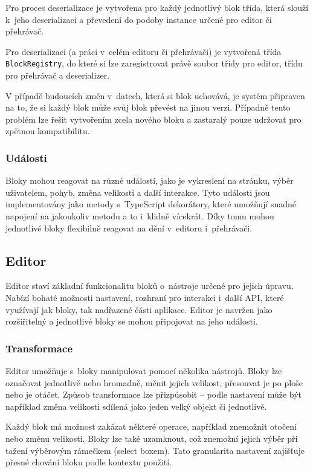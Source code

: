 Pro proces deserializace je vytvořena pro každý jednotlivý blok třída, která slouží k~jeho deserializaci a převedení do podoby instance určené pro editor či přehrávač.

Pro deserializaci (a práci v~celém editoru či přehrávači) je vytvořená třída \texttt{BlockRegistry}, do které si lze zaregistrovat právě soubor třídy pro editor, třídu pro přehrávač a deserializer. 

V případě budoucích změn v~datech, která si blok uchovává, je systém připraven na to, že si každý blok může svůj blok převést na jinou verzi.
Případně tento problém lze řešit vytvořením zcela nového bloku a zastaralý pouze udržovat pro zpětnou kompatibilitu.

\subsubsection{Události}

Bloky mohou reagovat na různé události, jako je vykreslení na stránku, výběr uživatelem, pohyb, změna velikosti a další interakce.
Tyto události jsou implementovány jako metody s~TypeScript dekorátory, které umožňují snadné napojení na jakoukoliv metodu a to i~klidně vícekrát.
Díky tomu mohou jednotlivé bloky flexibilně reagovat na dění v~editoru i~přehrávači.

\subsection{Editor}

Editor staví základní funkcionalitu bloků o~nástroje určené pro jejich úpravu. 
Nabízí bohaté možnosti nastavení, rozhraní pro interakci i~další API, které využívají jak bloky, tak nadřazené části aplikace.
Editor je navržen jako rozšiřitelný a jednotlivé bloky se mohou připojovat na jeho události.

\subsubsection{Transformace}

Editor umožňuje s~bloky manipulovat pomocí několika nástrojů. 
Bloky lze označovat jednotlivě nebo hromadně, měnit jejich velikost, přesouvat je po ploše nebo je otáčet. 
Způsob transformace lze přizpůsobit -- podle nastavení může být například změna velikosti sdílená jako jeden velký objekt či jednotlivě.

Každý blok má možnost zakázat některé operace, například znemožnit otočení nebo změnu velikosti. 
Bloky lze také uzamknout, což znemožní jejich výběr při tažení výběrovým rámečkem (select boxem). 
Tato granularita nastavení zajišťuje přesné chování bloku podle kontextu použití.


